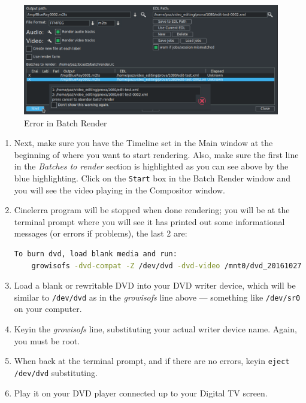 \begin{figure}[htpb]
    \centering
    \includegraphics[width=0.8\linewidth]{images/dvd-batch05.png}
    \caption{Error in Batch Render}
    \label{fig:dvd-batch05}
\end{figure}

\begin{enumerate}[start=13]
    \item Next, make sure you have the Timeline set in the Main window at the beginning of where you want to start rendering.  Also, make sure the first line in the \textit{Batches to render} section is highlighted as you can see above by the blue highlighting.  Click on the \texttt{Start} box in the Batch Render window and you will see the video playing in the Compositor window.
    \item Cinelerra program will be stopped when done rendering; you will be at the terminal prompt where you will see it has printed out some informational messages (or errors if problems), the last 2 are:
    \begin{lstlisting}[language=bash,numbers=none]
    To burn dvd, load blank media and run:
    growisofs -dvd-compat -Z /dev/dvd -dvd-video /mnt0/dvd_20161027-131723/iso
    \end{lstlisting}
    \item Load a blank or rewritable DVD into your DVD writer device, which will be similar to \texttt{/dev/dvd} as in the \textit{growisofs} line above --- something like \texttt{/dev/sr0} on your computer.
    \item Keyin the \textit{growisofs} line, substituting your actual writer device name.  Again, you must be root.
    \item When back at the terminal prompt, and if there are no errors, keyin \texttt{eject /dev/dvd} substituting.
    \item Play it on your DVD player connected up to your Digital TV screen.
\end{enumerate}



